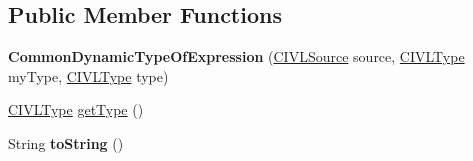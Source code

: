 \subsection*{Public Member Functions}
\begin{DoxyCompactItemize}
\item 
\hypertarget{classedu_1_1udel_1_1cis_1_1vsl_1_1civl_1_1model_1_1common_1_1expression_1_1CommonDynamicTypeOfExpression_a2609b900992da15cfe662c47adc4d5ea}{}{\bfseries Common\+Dynamic\+Type\+Of\+Expression} (\hyperlink{interfaceedu_1_1udel_1_1cis_1_1vsl_1_1civl_1_1model_1_1IF_1_1CIVLSource}{C\+I\+V\+L\+Source} source, \hyperlink{interfaceedu_1_1udel_1_1cis_1_1vsl_1_1civl_1_1model_1_1IF_1_1type_1_1CIVLType}{C\+I\+V\+L\+Type} my\+Type, \hyperlink{interfaceedu_1_1udel_1_1cis_1_1vsl_1_1civl_1_1model_1_1IF_1_1type_1_1CIVLType}{C\+I\+V\+L\+Type} type)\label{classedu_1_1udel_1_1cis_1_1vsl_1_1civl_1_1model_1_1common_1_1expression_1_1CommonDynamicTypeOfExpression_a2609b900992da15cfe662c47adc4d5ea}

\item 
\hyperlink{interfaceedu_1_1udel_1_1cis_1_1vsl_1_1civl_1_1model_1_1IF_1_1type_1_1CIVLType}{C\+I\+V\+L\+Type} \hyperlink{classedu_1_1udel_1_1cis_1_1vsl_1_1civl_1_1model_1_1common_1_1expression_1_1CommonDynamicTypeOfExpression_ad859f652edd7b9920045de345282ce1e}{get\+Type} ()
\item 
\hypertarget{classedu_1_1udel_1_1cis_1_1vsl_1_1civl_1_1model_1_1common_1_1expression_1_1CommonDynamicTypeOfExpression_a3de1bc24426d62aa24b2946d0fbbefda}{}String {\bfseries to\+String} ()\label{classedu_1_1udel_1_1cis_1_1vsl_1_1civl_1_1model_1_1common_1_1expression_1_1CommonDynamicTypeOfExpression_a3de1bc24426d62aa24b2946d0fbbefda}


\end{DoxyCompactItemize}
